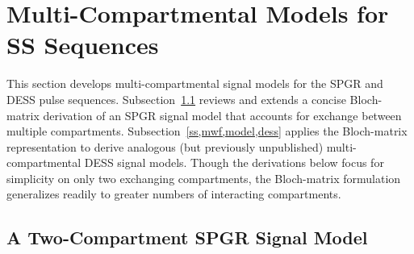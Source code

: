 \section{Multi-Compartmental Models for SS Sequences}
\label{s,mwf,model}

This section develops multi-compartmental signal models
for the SPGR and DESS pulse sequences.
Subsection~\ref{ss,mwf,model,spgr} reviews and extends
a concise Bloch-matrix derivation \cite{spencer:00:mos}
of an SPGR signal model 
that accounts for exchange 
between multiple compartments.
Subsection~\ref{ss,mwf,model,dess} applies 
the Bloch-matrix representation
to derive analogous 
(but previously unpublished)
multi-compartmental DESS signal models. 
Though the derivations below
focus for simplicity
on only two exchanging compartments,
the Bloch-matrix formulation generalizes readily
to greater numbers of interacting compartments.

\subsection{A Two-Compartment SPGR Signal Model}
\label{ss,mwf,model,spgr}

